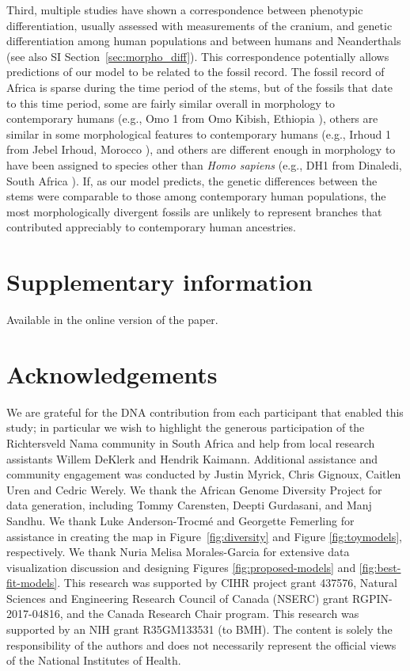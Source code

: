 \documentclass[]{article}
\begin{document}
Third, multiple studies have shown a correspondence between phenotypic
differentiation, usually assessed with measurements of the cranium, and genetic
differentiation among human populations and between humans and Neanderthals
\citep{Relethford1994-mh,Weaver2008-ho,Von_Cramon-Taubadel2009-zb} (see also SI
Section~\ref{sec:morpho_diff}). This correspondence potentially allows
predictions of our model to be related to the fossil record. The fossil record
of Africa is sparse during the time period of the stems, but of the fossils
that date to this time period, some are fairly similar overall in morphology to
contemporary humans (e.g., Omo 1 from Omo Kibish, Ethiopia
\citep{Day1969-rh,Vidal2022-qe}), others are similar in some morphological
features to contemporary humans (e.g., Irhoud 1 from Jebel Irhoud, Morocco
\citep{Hublin2017-cq,Richter2017-zu}), and others are different enough in
morphology to have been assigned to species other than \emph{Homo sapiens}
(e.g., DH1 from Dinaledi, South Africa \citep{Berger2015-bq,Dirks2017-uk}). If,
as our model predicts, the genetic differences between the stems were
comparable to those among contemporary human populations, the most
morphologically divergent fossils are unlikely to represent branches that
contributed appreciably to contemporary human ancestries.




\section*{Supplementary information}
Available in the online version of the paper.

\section*{Acknowledgements}

We are grateful for the DNA contribution from each participant that enabled
this study; in particular we wish to highlight the generous participation of
the Richtersveld Nama community in South Africa and help from local research
assistants Willem DeKlerk and Hendrik Kaimann. Additional assistance and
community engagement was conducted by Justin Myrick, Chris Gignoux, Caitlen
Uren and Cedric Werely. We thank the African Genome Diversity Project for data
generation, including Tommy Carensten, Deepti Gurdasani, and Manj Sandhu. We
thank Luke Anderson-Trocm\'e and Georgette Femerling for assistance in creating
the map in Figure~\ref{fig:diversity} and Figure \ref{fig:toymodels},
respectively. We thank Nuria Melisa Morales-Garcia for extensive data
visualization discussion and designing Figures \ref{fig:proposed-models} and
\ref{fig:best-fit-models}. This research was supported by CIHR project grant 437576,
Natural Sciences and Engineering Research Council of Canada (NSERC) grant RGPIN-2017-04816, 
and the Canada Research Chair program. 
This research was supported by an NIH grant
R35GM133531 (to BMH). The content is solely the responsibility of the authors
and does not necessarily represent the official views of the National
Institutes of Health.
\end{document}
